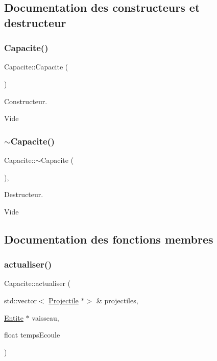 \subsection{Documentation des constructeurs et destructeur}
\mbox{\label{class_capacite_a8a1aebc5b2332e366a3f207c23b4d363}} 
\subsubsection{\texorpdfstring{Capacite()}{Capacite()}}
{\footnotesize\ttfamily Capacite\+::\+Capacite (\begin{DoxyParamCaption}{ }\end{DoxyParamCaption})\hspace{0.3cm}{\ttfamily [default]}}



Constructeur. 

Vide \mbox{\label{class_capacite_a43be1570a24a64682ff3f034330779a9}} 
\subsubsection{\texorpdfstring{$\sim$\+Capacite()}{~Capacite()}}
{\footnotesize\ttfamily Capacite\+::$\sim$\+Capacite (\begin{DoxyParamCaption}{ }\end{DoxyParamCaption})\hspace{0.3cm}{\ttfamily [virtual]}, {\ttfamily [default]}}



Destructeur. 

Vide 

\subsection{Documentation des fonctions membres}
\mbox{\label{class_capacite_a924214972f385ef409031bafc0f315b7}} 
\subsubsection{\texorpdfstring{actualiser()}{actualiser()}}
{\footnotesize\ttfamily Capacite\+::actualiser (\begin{DoxyParamCaption}\item[{std\+::vector$<$ \hyperlink{class_projectile}{Projectile} $\ast$$>$ \&}]{projectiles,  }\item[{\hyperlink{class_entite}{Entite} $\ast$}]{vaisseau,  }\item[{float}]{temps\+Ecoule }\end{DoxyParamCaption})\hspace{0.3cm}{\ttfamily [pure virtual]}}



